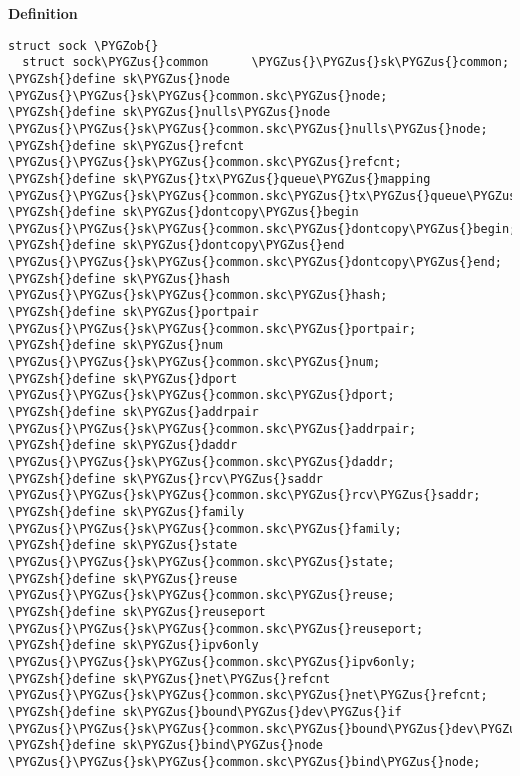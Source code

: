 \documentclass[a4paper,8pt,english]{sphinxmanual}
\def\PYGZus{\char`\_}
\def\PYGZob{\char`\{}
\def\PYGZsh{\char`\#}
\begin{document}
\textbf{Definition}

\begin{Verbatim}[commandchars=\\\{\}]
struct sock \PYGZob{}
  struct sock\PYGZus{}common      \PYGZus{}\PYGZus{}sk\PYGZus{}common;
\PYGZsh{}define sk\PYGZus{}node                 \PYGZus{}\PYGZus{}sk\PYGZus{}common.skc\PYGZus{}node;
\PYGZsh{}define sk\PYGZus{}nulls\PYGZus{}node           \PYGZus{}\PYGZus{}sk\PYGZus{}common.skc\PYGZus{}nulls\PYGZus{}node;
\PYGZsh{}define sk\PYGZus{}refcnt               \PYGZus{}\PYGZus{}sk\PYGZus{}common.skc\PYGZus{}refcnt;
\PYGZsh{}define sk\PYGZus{}tx\PYGZus{}queue\PYGZus{}mapping     \PYGZus{}\PYGZus{}sk\PYGZus{}common.skc\PYGZus{}tx\PYGZus{}queue\PYGZus{}mapping;
\PYGZsh{}define sk\PYGZus{}dontcopy\PYGZus{}begin       \PYGZus{}\PYGZus{}sk\PYGZus{}common.skc\PYGZus{}dontcopy\PYGZus{}begin;
\PYGZsh{}define sk\PYGZus{}dontcopy\PYGZus{}end         \PYGZus{}\PYGZus{}sk\PYGZus{}common.skc\PYGZus{}dontcopy\PYGZus{}end;
\PYGZsh{}define sk\PYGZus{}hash                 \PYGZus{}\PYGZus{}sk\PYGZus{}common.skc\PYGZus{}hash;
\PYGZsh{}define sk\PYGZus{}portpair             \PYGZus{}\PYGZus{}sk\PYGZus{}common.skc\PYGZus{}portpair;
\PYGZsh{}define sk\PYGZus{}num                  \PYGZus{}\PYGZus{}sk\PYGZus{}common.skc\PYGZus{}num;
\PYGZsh{}define sk\PYGZus{}dport                \PYGZus{}\PYGZus{}sk\PYGZus{}common.skc\PYGZus{}dport;
\PYGZsh{}define sk\PYGZus{}addrpair             \PYGZus{}\PYGZus{}sk\PYGZus{}common.skc\PYGZus{}addrpair;
\PYGZsh{}define sk\PYGZus{}daddr                \PYGZus{}\PYGZus{}sk\PYGZus{}common.skc\PYGZus{}daddr;
\PYGZsh{}define sk\PYGZus{}rcv\PYGZus{}saddr            \PYGZus{}\PYGZus{}sk\PYGZus{}common.skc\PYGZus{}rcv\PYGZus{}saddr;
\PYGZsh{}define sk\PYGZus{}family               \PYGZus{}\PYGZus{}sk\PYGZus{}common.skc\PYGZus{}family;
\PYGZsh{}define sk\PYGZus{}state                \PYGZus{}\PYGZus{}sk\PYGZus{}common.skc\PYGZus{}state;
\PYGZsh{}define sk\PYGZus{}reuse                \PYGZus{}\PYGZus{}sk\PYGZus{}common.skc\PYGZus{}reuse;
\PYGZsh{}define sk\PYGZus{}reuseport            \PYGZus{}\PYGZus{}sk\PYGZus{}common.skc\PYGZus{}reuseport;
\PYGZsh{}define sk\PYGZus{}ipv6only             \PYGZus{}\PYGZus{}sk\PYGZus{}common.skc\PYGZus{}ipv6only;
\PYGZsh{}define sk\PYGZus{}net\PYGZus{}refcnt           \PYGZus{}\PYGZus{}sk\PYGZus{}common.skc\PYGZus{}net\PYGZus{}refcnt;
\PYGZsh{}define sk\PYGZus{}bound\PYGZus{}dev\PYGZus{}if         \PYGZus{}\PYGZus{}sk\PYGZus{}common.skc\PYGZus{}bound\PYGZus{}dev\PYGZus{}if;
\PYGZsh{}define sk\PYGZus{}bind\PYGZus{}node            \PYGZus{}\PYGZus{}sk\PYGZus{}common.skc\PYGZus{}bind\PYGZus{}node;

\end{Verbatim}
\end{document}
